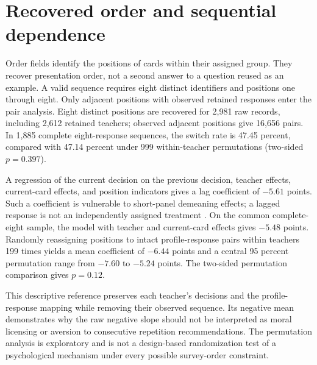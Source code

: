 
\clearpage\section{Recovered order and sequential dependence}\label{app:sequence}
\begin{addition}
Order fields identify the positions of cards within their assigned group. They recover presentation order, not a second answer to a question reused as an example. A valid sequence requires eight distinct identifiers and positions one through eight. Only adjacent positions with observed retained responses enter the pair analysis. Eight distinct positions are recovered for 2,981 raw records, including 2,612 retained teachers; observed adjacent positions give 16,656 pairs. In 1,885 complete eight-response sequences, the switch rate is 47.45 percent, compared with 47.14 percent under 999 within-teacher permutations (two-sided $p=0.397$).

A regression of the current decision on the previous decision, teacher effects, current-card effects, and position indicators gives a lag coefficient of $-5.61$ points. Such a coefficient is vulnerable to short-panel demeaning effects; a lagged response is not an independently assigned treatment \cite{nickell}. On the common complete-eight sample, the model with teacher and current-card effects gives $-5.48$ points. Randomly reassigning positions to intact profile-response pairs within teachers 199 times yields a mean coefficient of $-6.44$ points and a central 95 percent permutation range from $-7.60$ to $-5.24$ points. The two-sided permutation comparison gives $p=0.12$.

This descriptive reference preserves each teacher's decisions and the profile-response mapping while removing their observed sequence. Its negative mean demonstrates why the raw negative slope should not be interpreted as moral licensing or aversion to consecutive repetition recommendations. The permutation analysis is exploratory and is not a design-based randomization test of a psychological mechanism under every possible survey-order constraint.
\end{addition}

